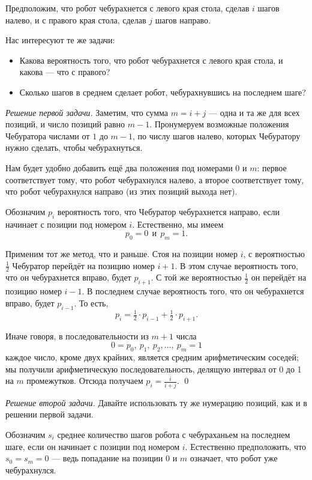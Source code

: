 \documentclass{article}
\begin{document}
Предположим, что робот чебурахнется с левого края стола, сделав $i$ шагов налево,
и с правого края стола, сделав $j$ шагов направо.

Нас интересуют те же задачи:

\begin{itemize}
\item Какова вероятность того, что робот чебурахнется с левого края стола, и какова --- что с правого?
\item Сколько шагов в среднем сделает робот, чебурахнувшись на последнем шаге?
\end{itemize}

\medskip
\noindent\textit{Решение первой задачи.}
Заметим, что сумма $m=i+j$ --- одна и та же для всех позиций, и число позиций равно $m-1$.
Пронумеруем возможные положения Чебуратора числами от $1$ до $m-1$,
по числу шагов налево, которых Чебуратору нужно сделать, чтобы чебурахнуться.

Нам будет удобно добавить ещё два положения под номерами $0$ и $m$:
первое соответствует тому, что робот чебурахнулся налево, 
а второе соответствует тому, что робот чебурахнулся направо
(из этих позиций выхода нет).

Обозначим $p_i$ вероятность того, что Чебуратор чебурахнется направо,
если начинает с позиции под номером $i$.
Естественно, мы имеем 
\[p_0=0\ \  \text{и}\ \  p_{m}=1.\]

Применим тот же метод, что и раньше.
Стоя на позиции номер $i$, с вероятностью $\tfrac12$ Чебуратор перейдёт на позицию номер $i+1$.
В этом случае вероятность того, что он чебурахнется вправо, будет $p_{i+1}$.
С той же вероятностью $\tfrac12$ он перейдёт на позицию номер $i-1$. 
В последнем случае вероятность того, что он чебурахнется вправо, будет $p_{i-1}$.
То есть,
\[p_i=\tfrac12\cdot p_{i-1}+\tfrac12\cdot p_{i+1}.\]

Иначе говоря, в последовательности из $m+1$ числа
\[0=p_0,\ p_1,\ p_2,\dots,\ p_{m}=1\] 
каждое число, кроме двух крайних, является средним арифметическим 
соседей; мы получили арифметическую последовательность, делящую интервал от 0 до 1 на $m$ промежутков.
Отсюда получаем $p_i=\tfrac i{i+j}$.
\qed

\medskip
\noindent\textit{Решение второй задачи.}
Давайте использовать ту же нумерацию позиций, как и в решении первой задачи.

Обозначим $s_i$ среднее количество шагов робота с чебураханьем на последнем шаге, если он начинает с позиции под номером $i$.
Естественно предположить, что $s_0=s_{m}=0$ ---
ведь попадание на позиции $0$ и $m$ означает, что робот уже чебурахнулся.
\end{document}
